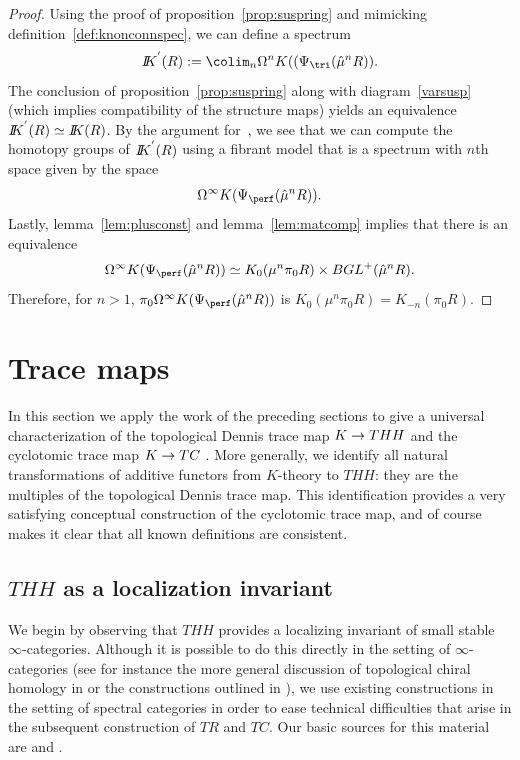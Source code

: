 \documentclass{amsart}
\newcommand{\htp}{\simeq}
\renewcommand{\to}{\mathchoice{\longrightarrow}{\rightarrow}{\rightarrow}{\rightarrow}}
\newcommand{\bbK}{I\mspace{-6.mu}K}
\renewcommand{\i}{\infty}
\numberwithin{equation}{section}
\theoremstyle{definition}
\begin{document}
\begin{proof}
Using the proof of proposition~\ref{prop:suspring} and mimicking
definition~\ref{def:knonconnspec}, we can define a spectrum  
\[
{\bbK}^{'}(R) := \colim_n \Omega^n K((\Psi_{\tri}(\hat{\mu}^n R)).
\]
The conclusion of proposition~\ref{prop:suspring} along with
diagram~\ref{varsusp} (which implies compatibility of the structure
maps) yields an equivalence ${\bbK}^{'}(R) \htp \bbK(R)$.  By the argument
for~\cite[11.7]{Marco}, we see that we can compute the homotopy groups
of ${\bbK}^{'}(R)$ using a fibrant model that is a spectrum with $n$th
space given by the space
\[
\Omega^{\infty} K(\Psi_{\perf}(\hat{\mu}^n R)).
\]
Lastly, lemma~\ref{lem:plusconst} and lemma~\ref{lem:matcomp} implies
that there is an equivalence  
\[
\Omega^{\infty} K(\Psi_{\perf}(\hat{\mu}^n R)) \htp K_0(\mu^n \pi_0 R) \times
BGL^{+}(\hat{\mu}^n R).
\]
Therefore, for $n > 1$, $\pi_0 \Omega^{\infty}
K(\Psi_{\perf}(\hat{\mu}^n R))$ is $K_0(\mu^n \pi_0 R) =
K_{-n}(\pi_0 R)$.
\end{proof}

\section{Trace maps}\label{sec:cyclo}

In this section we apply the work of the preceding sections to give a
universal characterization of the topological Dennis trace map $K \to
THH$ \cite{Bokstedt} and the cyclotomic trace map $K \to
TC$ \cite{BokstedtHsiangMadsen}.  More generally, we identify all
natural transformations of additive functors from $K$-theory to $THH$:
they are the multiples of the topological Dennis trace map.  This
identification provides a very satisfying conceptual construction of
the cyclotomic trace map, and of course makes it clear that all known
definitions are consistent.

\subsection{$THH$ as a localization invariant}
We begin by observing that $THH$ provides a localizing invariant of
small stable $\i$-categories.  Although it is possible to do this
directly in the setting of $\i$-categories (see for instance the more
general discussion of topological chiral homology in \cite[\S
5.3]{HAG} or the constructions outlined in \cite[5.1.1]{BFN}), we use
existing constructions in the setting of spectral categories in order
to ease technical difficulties that arise in the subsequent
construction of $TR$ and $TC$.  Our basic sources for this material
are \cite{BM} and \cite{BM2}.
\end{document}
